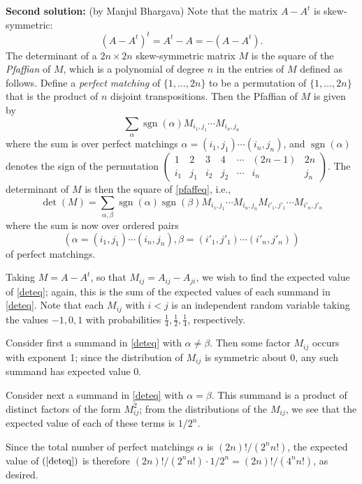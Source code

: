 \documentclass[amssymb,twocolumn,pra,10pt,aps]{revtex4-1}
\DeclareMathOperator{\sgn}{sgn}
\begin{document}
\begin{itemize}
\noindent
\textbf{Second solution:}
(by Manjul Bhargava)
Note that the matrix $A-A^t$ is skew-symmetric: 
\[
(A-A^t)^t = A^t-A = -(A-A^t).
\]
The determinant of a $2n \times 2n$ skew-symmetric matrix $M$ is the square of the {\it Pfaffian} of $M$, which is a polynomial of degree $n$ in the entries of $M$ defined as follows. Define a {\it perfect matching} of $\{1,\ldots,2n\}$ to be a permutation of $\{1,\ldots,2n\}$ that is the product of $n$ disjoint transpositions. Then the Pfaffian of $M$ is given by
\begin{equation}\label{pfaffeq}
\sum_{\alpha} \sgn(\alpha) M_{i_1,j_1}\cdots M_{i_n,j_n}
\end{equation}
where the sum is over perfect matchings $\alpha=(i_1,j_1)\cdots(i_n,j_n)$,
and $\sgn(\alpha)$ denotes the sign of the permutation
$\left(\begin{smallmatrix}
1&2&3&4&\cdots & (2n-1)&2n \\
i_1&j_1&i_2&j_2& \cdots & i_n & j_n
\end{smallmatrix} \right)$.
The determinant of $M$ is then the square of \eqref{pfaffeq}, i.e.,
\begin{equation}\label{deteq} \det(M)=\sum_{\alpha,\beta} \sgn(\alpha)\sgn(\beta) M_{i_1,j_1}\cdots M_{i_n,j_n}M_{i'_1,j'_1}\cdots M_{i'_n,j'_n}
\end{equation}
where the sum is now over ordered pairs $$(\alpha=(i_1,j_1)\cdots(i_n,j_n),\beta=(i'_1,j'_1)\cdots(i'_n,j'_n))$$ of perfect matchings.

Taking $M = A - A^t$, so that $M_{ij} = A_{ij} - A_{ji}$,
we wish to find the expected value of \eqref{deteq}; again, this is the sum of the expected values of each summand in \eqref{deteq}. Note that each $M_{ij}$ with $i < j$ is an independent random variable taking the values $-1,0,1$ with probabilities $\frac14,\frac12,\frac14$, respectively.

Consider first a summand in \eqref{deteq} with $\alpha\neq \beta$. Then some factor $M_{ij}$  occurs with exponent 1; since the distribution of $M_{ij}$ is symmetric about 0, any such summand has expected value 0.

Consider next a summand in \eqref{deteq} with $\alpha= \beta$. This summand is a product of distinct factors of the form $M_{ij}^2$; from the distributions of the $M_{ij}$, we see that the expected value of each of these terms is $1/2^n$.

Since the total number of perfect matchings $\alpha$ is $(2n)!/(2^nn!)$, the expected value of $(\ref{deteq})$ is therefore $(2n)!/(2^nn!)\cdot 1/2^n=(2n)!/(4^nn!)$, as desired.


\end{itemize}
\end{document}
